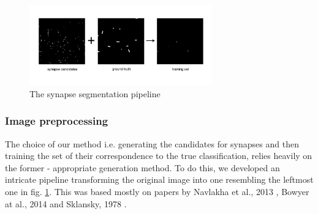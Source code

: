 \documentclass[a4paper, 11pt]{article}
\numberwithin{equation}{section}
\begin{document}
		\begin{figure}[!h]
			\centering
			\includegraphics[page=1,width=0.70\textwidth]{segmentation_pipeline.pdf}
			\caption{\label{fig:segmentation_pipeline}{The synapse segmentation pipeline}}
		\end{figure}
		
		\subsubsection{Image preprocessing}
		
		The choice of our method i.e. generating the candidates for synapses and then training the set of their correspondence to the true classification, relies heavily on the former - appropriate generation method. To do this, we developed an intricate pipeline transforming the original image into one resembling the leftmost one in fig. \ref{fig:segmentation_pipeline}. This was based mostly on papers by Navlakha et al., 2013 \cite{navlakha2013high}, Bowyer at al., 2014 \cite{bowyer2014analysis} and Sklansky, 1978 \cite{sklansky1978image}.\\ 
		
\end{document}
